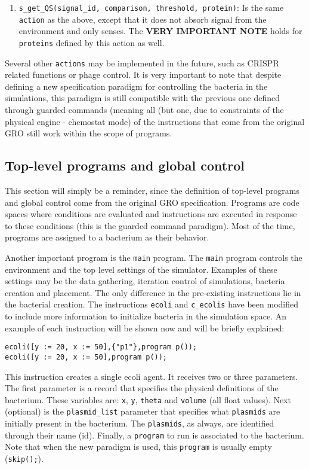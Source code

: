 \documentclass[10pt,a4paper]{article}
\begin{document}
\begin{enumerate}
	\item \texttt{s\_get\_QS(signal\_id, comparison, threshold, protein)}: Is the same \texttt{action} as the above, except that it does not absorb signal from the environment and only senses. The \textbf{VERY IMPORTANT NOTE} holds for \texttt{proteins} defined by this action as well.
\end{enumerate}

Several other \texttt{actions} may be implemented in the future, such as CRISPR related functions or phage control. It is very important to note that despite defining a new specification paradigm for controlling the bacteria in the simulations, this paradigm is still compatible with the previous one defined through guarded commands (meaning all (but one, due to constraints of the physical engine - chemostat mode) of the instructions that come from the original GRO still work within the scope of programs. \newpage

\subsection{Top-level programs and global control}
This section will simply be a reminder, since the definition of top-level programs and global control come from the original GRO specification.
Programs are code spaces where conditions are evaluated and instructions are executed in response to these conditions (this is the guarded command paradigm). Most of the time, programs are assigned to a bacterium as their behavior. \newline

Another important program is the \texttt{main} program. The \texttt{main} program controls the environment and the top level settings of the simulator. Examples of these settings may be the data gathering, iteration control of simulations, bacteria creation and placement. The only difference in the pre-existing instructions lie in the bacterial creation. The instructions \texttt{ecoli} and \texttt{c\_ecolis} have been modified to include more information to initialize bacteria in the simulation space. An example of each instruction will be shown now and will be briefly explained:

\begin{Verbatim}[obeytabs]
ecoli([y := 20, x := 50],{"p1"},program p());
ecoli([y := 20, x := 50],program p());
\end{Verbatim}

This instruction creates a single ecoli agent. It receives two or three parameters. The first parameter is a record that specifies the physical definitions of the bacterium. These variables are: \texttt{x}, \texttt{y}, \texttt{theta} and \texttt{volume} (all float values). Next (optional) is the \texttt{plasmid\_list} parameter that specifies what \texttt{plasmids} are initially present in the bacterium. The \texttt{plasmids}, as always, are identified through their name (id). Finally, a \texttt{program} to run is associated to the bacterium. Note that when the new paradigm is used, this \texttt{program} is usually empty (\texttt{skip();}).
\end{document}
